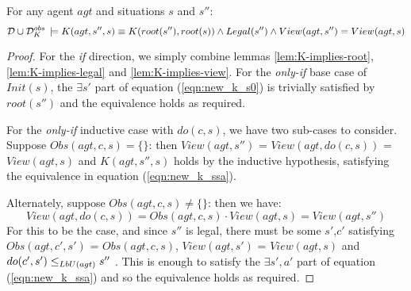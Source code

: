 \begin{thmext}
[{\ref{thm:k_obs_equiv}}] For any agent $agt$ and situations $s$
and $s''$:\[
\mathcal{D}\cup\mathcal{D}_{K}^{obs}\,\models K(agt,s'',s)\equiv K(root(s''),root(s))\wedge Legal(s'')\wedge View(agt,s'')=View(agt,s)\]

\end{thmext}
\begin{proof}
For the \emph{if} direction, we simply combine lemmas \ref{lem:K-implies-root},
\ref{lem:K-implies-legal} and \ref{lem:K-implies-view}. For the
\emph{only-if} base case of $Init(s)$, the $\exists s'$ part of
equation (\ref{eqn:new_k_s0}) is trivially satisfied by $root(s'')$
and the equivalence holds as required.

For the \emph{only-if} inductive case with $do(c,s)$, we have two
sub-cases to consider. Suppose $Obs(agt,c,s)=\{\}$: then $View(agt,s'')$
= $View(agt,do(c,s))$ = $View(agt,s)$ and $K(agt,s'',s)$ holds
by the inductive hypothesis, satisfying the equivalence in equation
(\ref{eqn:new_k_ssa}). 

Alternately, suppose $Obs(agt,c,s)\neq\{\}$: then we have:\[
View(agt,do(c,s))=Obs(agt,c,s)\cdot View(agt,s)=View(agt,s'')\]
For this to be the case, and since $s''$ is legal, there must be
some $s'$,$c'$ satisfying $Obs(agt,c',s')$ = $Obs(agt,c,s)$, $View(agt,s')$
= $View(agt,s)$ and $do(c',s')\leq_{LbU(agt)}s''$ . This is enough
to satisfy the $\exists s',a'$ part of equation (\ref{eqn:new_k_ssa})
and so the equivalence holds as required.
\end{proof}
\medskip{}


